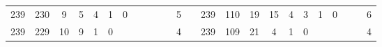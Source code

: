 {\begin{tabular}{cccccccccccclccccccccccc}
239                                                & 230                                                & 9                                                & 5                                                & 4                                                & 1                                                & 0                                               &                                                 &                                                 &                                                 &                                                 & 5                                                &                          & 239                                                & 110                                                & 19                                               & 15                                               & 4                                               & 3                                               & 1                                               & 0                                               &                                                 &                                                 & 6                                                \\
239                                                & 229                                                & 10                                               & 9                                                & 1                                                & 0                                                &                                                 &                                                 &                                                 &                                                 &                                                 & 4                                                &                          & 239                                                & 109                                                & 21                                               & 4                                                & 1                                               & 0                                               &                                                 &                                                 &                                                 &                                                 & 4                                                \\

\end{tabular}}
